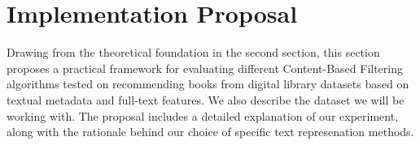 \documentclass[\myFontSize,a4paper,oneside,english,hidelinks]{article}
\begin{document}
\clearpage
%
%




\section{Implementation Proposal}
Drawing from the theoretical foundation in the second section, this section proposes a practical framework for evaluating different Content-Based Filtering algorithms tested on recommending books from digital library datasets based on textual metadata and full-text features. We also describe the dataset we will be working with. The proposal includes a detailed explanation of our experiment, along with the rationale behind our choice of specific text represenation methods.\\ 
%
\end{document}
